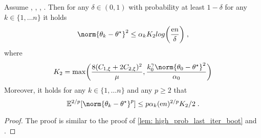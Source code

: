 \begin{lemma}
\label{lem: high_prob_last_iter}
Assume , , , . Then for any $\delta \in (0,1)$ with probability at least $1-\delta$  for any $k\in\{1,\ldots n\}$ it holds 
\begin{equation}
    \norm{\theta_k - \thetas}^2 \leq \alpha_k K_2 log\biggl(\frac{\rme n}{\delta}\biggr)\eqsp, 
\end{equation}
where 
\begin{equation}
    \label{eq:def_K_2}
    K_2 = \max\biggl(\frac{8(C_{1,\xi}+2C_{2,\xi})^2}{\mu}, \frac{k_0^{\gamma}\norm{\theta_0-\thetas}^2}{\alpha_0}\biggr)
\end{equation}
Moreover, it holds 
for any $k\in\{1,\ldots n\}$ and any $p\geq 2$ that 
\begin{equation}
     \PE^{2/p}[\norm{\theta_k - \thetas}^{p}]\leq p\alpha_k (\rme n)^{2/p}K_2/2\eqsp.
\end{equation}
\end{lemma}
\begin{proof}
    The proof is similar to the proof of \cref{lem: high_prob_last_iter_boot} and . 
\end{proof}
